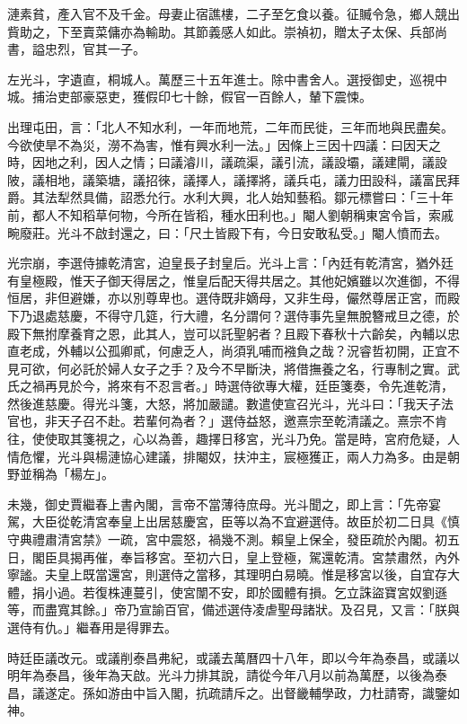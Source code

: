 \begin{pinyinscope}
漣素貧，產入官不及千金。母妻止宿譙樓，二子至乞食以養。征贓令急，鄉人競出貲助之，下至賣菜傭亦為輸助。其節義感人如此。崇禎初，贈太子太保、兵部尚書，謚忠烈，官其一子。

左光斗，字遺直，桐城人。萬歷三十五年進士。除中書舍人。選授御史，巡視中城。捕治吏部豪惡吏，獲假印七十餘，假官一百餘人，輦下震悚。

出理屯田，言：「北人不知水利，一年而地荒，二年而民徙，三年而地與民盡矣。今欲使旱不為災，澇不為害，惟有興水利一法。」因條上三因十四議：曰因天之時，因地之利，因人之情；曰議濬川，議疏渠，議引流，議設壩，議建閘，議設陂，議相地，議築塘，議招徠，議擇人，議擇將，議兵屯，議力田設科，議富民拜爵。其法犁然具備，詔悉允行。水利大興，北人始知藝稻。鄒元標嘗曰：「三十年前，都人不知稻草何物，今所在皆稻，種水田利也。」閹人劉朝稱東宮令旨，索戚畹廢莊。光斗不啟封還之，曰：「尺土皆殿下有，今日安敢私受。」閹人憤而去。

光宗崩，李選侍據乾清宮，迫皇長子封皇后。光斗上言：「內廷有乾清宮，猶外廷有皇極殿，惟天子御天得居之，惟皇后配天得共居之。其他妃嬪雖以次進御，不得恒居，非但避嫌，亦以別尊卑也。選侍既非嫡母，又非生母，儼然尊居正宮，而殿下乃退處慈慶，不得守几筵，行大禮，名分謂何？選侍事先皇無脫簪戒旦之德，於殿下無拊摩養育之恩，此其人，豈可以託聖躬者？且殿下春秋十六齡矣，內輔以忠直老成，外輔以公孤卿貳，何慮乏人，尚須乳哺而襁負之哉？況睿哲初開，正宜不見可欲，何必託於婦人女子之手？及今不早斷決，將借撫養之名，行專制之實。武氏之禍再見於今，將來有不忍言者。」時選侍欲專大權，廷臣箋奏，令先進乾清，然後進慈慶。得光斗箋，大怒，將加嚴譴。數遣使宣召光斗，光斗曰：「我天子法官也，非天子召不赴。若輩何為者？」選侍益怒，邀熹宗至乾清議之。熹宗不肯往，使使取其箋視之，心以為善，趣擇日移宮，光斗乃免。當是時，宮府危疑，人情危懼，光斗與楊漣協心建議，排閹奴，扶沖主，宸極獲正，兩人力為多。由是朝野並稱為「楊左」。

未幾，御史賈繼春上書內閣，言帝不當薄待庶母。光斗聞之，即上言：「先帝宴駕，大臣從乾清宮奉皇上出居慈慶宮，臣等以為不宜避選侍。故臣於初二日具《慎守典禮肅清宮禁》一疏，宮中震怒，禍幾不測。賴皇上保全，發臣疏於內閣。初五日，閣臣具揭再催，奉旨移宮。至初六日，皇上登極，駕還乾清。宮禁肅然，內外寧謐。夫皇上既當還宮，則選侍之當移，其理明白易曉。惟是移宮以後，自宜存大體，捐小過。若復株連蔓引，使宮闈不安，即於國體有損。乞立誅盜寶宮奴劉遜等，而盡寬其餘。」帝乃宣諭百官，備述選侍凌虐聖母諸狀。及召見，又言：「朕與選侍有仇。」繼春用是得罪去。

時廷臣議改元。或議削泰昌弗紀，或議去萬曆四十八年，即以今年為泰昌，或議以明年為泰昌，後年為天啟。光斗力排其說，請從今年八月以前為萬歷，以後為泰昌，議遂定。孫如游由中旨入閣，抗疏請斥之。出督畿輔學政，力杜請寄，識鑒如神。


\end{pinyinscope}
